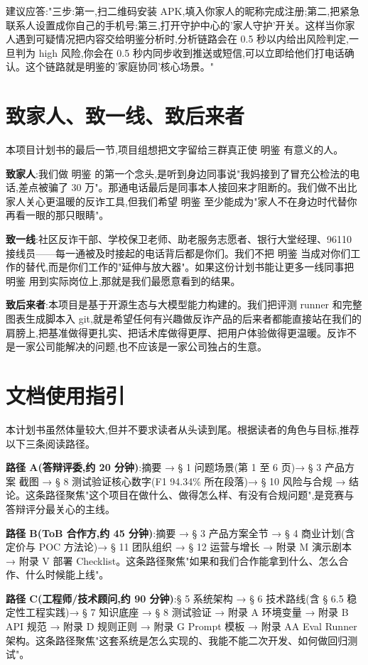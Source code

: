 \documentclass[UTF8,a4paper,12pt]{ctexart}
\begin{document}
建议应答:"三步:第一,扫二维码安装 APK,填入你家人的昵称完成注册;第二,把紧急联系人设置成你自己的手机号;第三,打开守护中心的'家人守护'开关。这样当你家人遇到可疑情况把内容交给明鉴分析时,分析链路会在 0.5 秒以内给出风险判定,一旦判为 high 风险,你会在 0.5 秒内同步收到推送或短信,可以立即给他们打电话确认。这个链路就是明鉴的'家庭协同'核心场景。"

\section{致家人、致一线、致后来者}

本项目计划书的最后一节,项目组想把文字留给三群真正使 明鉴 有意义的人。

\textbf{致家人}:我们做 明鉴 的第一个念头,是听到身边同事说"我妈接到了冒充公检法的电话,差点被骗了 30 万"。那通电话最后是同事本人接回来才阻断的。我们做不出比家人关心更温暖的反诈工具,但我们希望 明鉴 至少能成为"家人不在身边时代替你再看一眼的那只眼睛"。

\textbf{致一线}:社区反诈干部、学校保卫老师、助老服务志愿者、银行大堂经理、96110 接线员——每一通被及时接起的电话背后都是你们。我们不把 明鉴 当成对你们工作的替代,而是你们工作的"延伸与放大器"。如果这份计划书能让更多一线同事把 明鉴 用到实际岗位上,那就是我们最愿意看到的结果。

\textbf{致后来者}:本项目是基于开源生态与大模型能力构建的。我们把评测 runner 和完整图表生成脚本入 git,就是希望任何有兴趣做反诈产品的后来者都能直接站在我们的肩膀上,把基准做得更扎实、把话术库做得更厚、把用户体验做得更温暖。反诈不是一家公司能解决的问题,也不应该是一家公司独占的生意。

\section{文档使用指引}

本计划书虽然体量较大,但并不要求读者从头读到尾。根据读者的角色与目标,推荐以下三条阅读路径。

\textbf{路径 A(答辩评委,约 20 分钟)}:摘要 → § 1 问题场景(第 1 至 6 页)→ § 3 产品方案 截图 → § 8 测试验证核心数字(F1 94.34\% 所在段落)→ § 10 风险与合规 → 结论。这条路径聚焦"这个项目在做什么、做得怎么样、有没有合规问题",是竞赛与答辩评分最关心的主线。

\textbf{路径 B(ToB 合作方,约 45 分钟)}:摘要 → § 3 产品方案全节 → § 4 商业计划(含定价与 POC 方法论)→ § 11 团队组织 → § 12 运营与增长 → 附录 M 演示剧本 → 附录 V 部署 Checklist。这条路径聚焦"如果和我们合作能拿到什么、怎么合作、什么时候能上线"。

\textbf{路径 C(工程师/技术顾问,约 90 分钟)}:§ 5 系统架构 → § 6 技术路线(含 § 6.5 稳定性工程实践)→ § 7 知识底座 → § 8 测试验证 → 附录 A 环境变量 → 附录 B API 规范 → 附录 D 规则正则 → 附录 G Prompt 模板 → 附录 AA Eval Runner 架构。这条路径聚焦"这套系统是怎么实现的、我能不能二次开发、如何做回归测试"。
\end{document}
